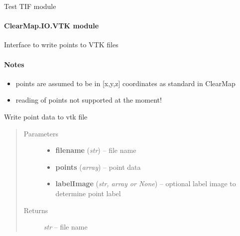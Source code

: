 \documentclass[letterpaper,10pt,english]{sphinxmanual}
\begin{document}

\begin{fulllineitems}
\label{api/ClearMap.IO:ClearMap.IO.TIF.test}
Test TIF module

\end{fulllineitems}



\paragraph{ClearMap.IO.VTK module}
\label{api/ClearMap.IO:module-ClearMap.IO.VTK}\label{api/ClearMap.IO:clearmap-io-vtk-module}
Interface to write points to VTK files
\paragraph{Notes}
\begin{itemize}
\item {} 
points are assumed to be in {[}x,y,z{]} coordinates as standard in ClearMap

\item {} 
reading of points not supported at the moment!

\end{itemize}

\begin{fulllineitems}
\label{api/ClearMap.IO:ClearMap.IO.VTK.writePoints}
Write point data to vtk file
\begin{quote}\begin{description}
\item[{Parameters}] \leavevmode\begin{itemize}
\item {} 
\textbf{filename} (\emph{str}) --
file name

\item {} 
\textbf{points} (\emph{array}) --
point data

\item {} 
\textbf{labelImage} (\emph{str, array or None}) --
optional label image to determine point label

\end{itemize}

\item[{Returns}] \leavevmode
\emph{str} --
file name

\end{description}\end{quote}

\end{fulllineitems}
\end{document}
